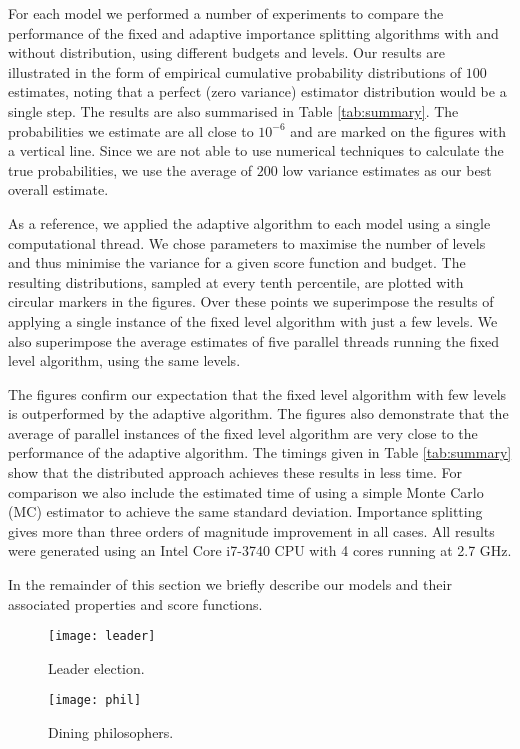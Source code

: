 \documentclass{llncs}
\begin{document}
For each model we performed a number of experiments to compare the
performance of the fixed and adaptive importance splitting algorithms
with and without distribution, using different budgets and levels.
Our results are illustrated in the form of empirical cumulative probability
distributions of $100$ estimates, noting that a perfect (zero variance)
estimator distribution would be a single step. The results are also
summarised in Table \ref{tab:summary}. The probabilities we estimate
are all close to $10^{-6}$ and are marked on the figures with a vertical
line. Since we are not able to use numerical techniques to calculate
the true probabilities, we use the average of $200$ low variance
estimates as our best overall estimate.

As a reference, we applied the adaptive algorithm to each model using
a single computational thread. We chose parameters to maximise the
number of levels and thus minimise the variance for a given score
function and budget. The resulting distributions, sampled at every
tenth percentile, are plotted with circular markers in the figures.
Over these points we superimpose the results of applying a single
instance of the fixed level algorithm with just a few levels. We also
superimpose the average estimates of five parallel threads running
the fixed level algorithm, using the same levels.

The figures confirm our expectation that the fixed level algorithm
with few levels is outperformed by the adaptive algorithm. The figures
also demonstrate that the average of parallel instances of the fixed
level algorithm are very close to the performance of the adaptive
algorithm. The timings given in Table \ref{tab:summary} show that
the distributed approach achieves these results in less time. For
comparison we also include the estimated time of using a simple Monte
Carlo (MC) estimator to achieve the same standard deviation. Importance
splitting gives more than three orders of magnitude improvement in
all cases. All results were generated using an Intel Core i7-3740
CPU with 4 cores running at 2.7 GHz.

In the remainder of this section we briefly describe our models and
their associated properties and score functions.

\begin{figure}
\begin{minipage}[t]{0.48\columnwidth}\texttt{[image: leader]}\protect\caption{Leader election.\label{fig:leader}}
\end{minipage}\quad{}\begin{minipage}[t]{0.48\columnwidth}\texttt{[image: phil]}\protect\caption{Dining philosophers.\label{fig:philosophers}}
\end{minipage}
\end{figure}
\end{document}
